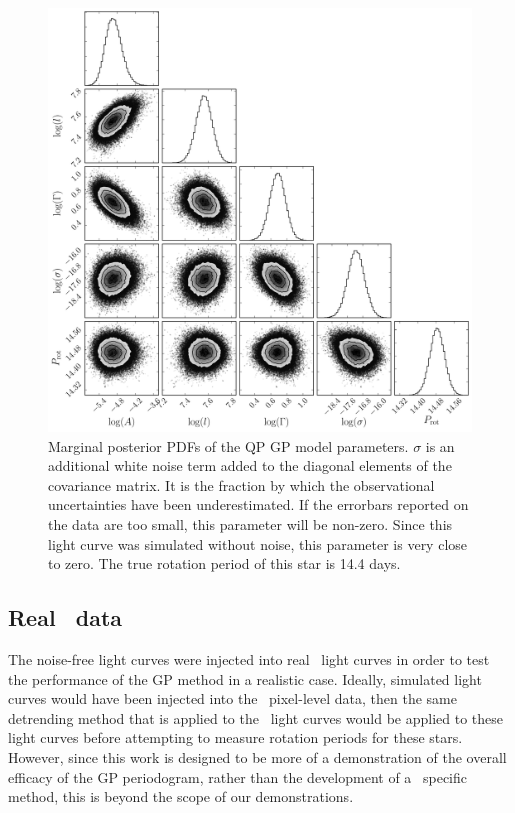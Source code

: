 \begin{figure}
\begin{center}
\includegraphics[width=6in, clip=true]{figures/demo_triangle.pdf}
\caption{Marginal posterior PDFs of the QP GP model parameters. $\sigma$ is an
additional white noise term added to the diagonal elements of the covariance
matrix. It is the fraction by which the observational uncertainties have been
underestimated. If the errorbars reported on the data are too small, this
parameter will be non-zero. Since this light curve was simulated without
noise, this parameter is very close to zero.
The true rotation period of this star is 14.4 days.}
\end{center}
\end{figure}
\label{fig:gp_posteriors}

\subsection{Real \kepler\ data}

The noise-free light curves were injected into real \kepler\ light curves in
order to test the performance of the GP method in a realistic case.
Ideally, simulated light curves would have been injected into the \kepler\
pixel-level data, then the same detrending method that is applied to the
\kepler\ light curves would be applied to these light curves before attempting
to measure rotation periods for these stars.
However, since this work is designed to be more of a demonstration of the
overall efficacy of the GP periodogram, rather than the development of a
\Kepler\ specific method, this is beyond the scope of our demonstrations.

